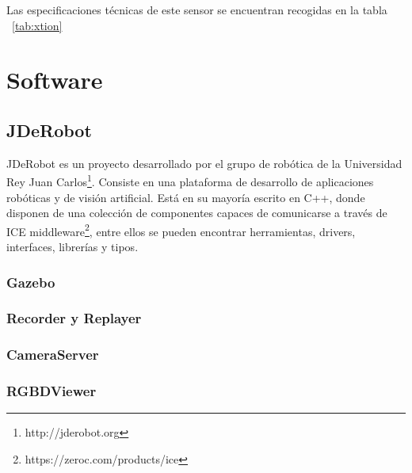 Las especificaciones técnicas de este sensor se encuentran recogidas en la tabla ~\ref{tab:xtion}
\section{Software}

\subsection{JDeRobot}

JDeRobot es un proyecto desarrollado por el grupo de robótica de la Universidad Rey Juan Carlos\footnote{http://jderobot.org}. Consiste en una plataforma de desarrollo de aplicaciones robóticas y de visión artificial. Está en su mayoría escrito en C++, donde disponen de una colección de componentes capaces de comunicarse a través de ICE middleware\footnote{https://zeroc.com/products/ice}, entre ellos se pueden encontrar herramientas, drivers, interfaces, librerías y tipos.

\subsubsection{Gazebo}

\subsubsection{Recorder y Replayer}

\subsubsection{CameraServer}

\subsubsection{RGBDViewer}



